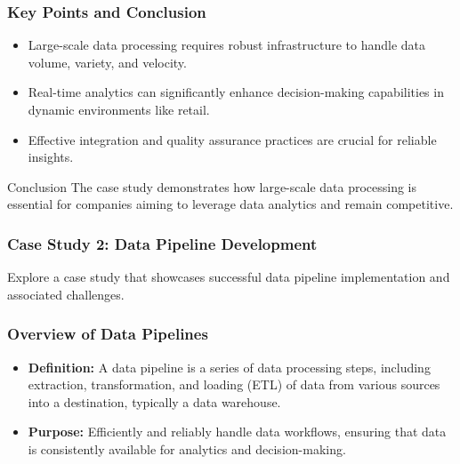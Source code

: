 \documentclass{beamer}
\begin{document}
\begin{frame}[fragile]
    \frametitle{Key Points and Conclusion}
    \begin{itemize}
        \item Large-scale data processing requires robust infrastructure to handle data volume, variety, and velocity.
        \item Real-time analytics can significantly enhance decision-making capabilities in dynamic environments like retail.
        \item Effective integration and quality assurance practices are crucial for reliable insights.
    \end{itemize}
    \begin{block}{Conclusion}
        The case study demonstrates how large-scale data processing is essential for companies aiming to leverage data analytics and remain competitive.
    \end{block}
\end{frame}

\begin{frame}
    \frametitle{Case Study 2: Data Pipeline Development}
    Explore a case study that showcases successful data pipeline implementation and associated challenges.
\end{frame}

\begin{frame}
    \frametitle{Overview of Data Pipelines}
    \begin{itemize}
        \item \textbf{Definition:} A data pipeline is a series of data processing steps, including extraction, transformation, and loading (ETL) of data from various sources into a destination, typically a data warehouse.
        \item \textbf{Purpose:} Efficiently and reliably handle data workflows, ensuring that data is consistently available for analytics and decision-making.
    \end{itemize}
\end{frame}
\end{document}
